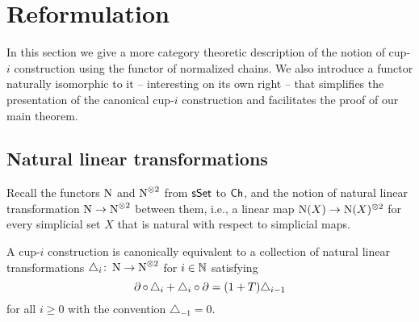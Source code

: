 
\section{Reformulation} \label{s:reformulation}

In this section we give a more category theoretic description of the notion of \mbox{cup-$i$} construction using the functor of normalized chains.
We also introduce a functor naturally isomorphic to it -- interesting on its own right -- that simplifies the presentation of the canonical cup-$i$ construction and facilitates the proof of our main theorem.

\subsection{Natural linear transformations}

Recall the functors $\operatorname{N}$ and $\operatorname{N}^{\otimes 2}$ from $\mathsf{sSet}$ to $\mathsf{Ch}$, and the notion of natural linear transformation $\operatorname{N} \to \operatorname{N}^{\otimes 2}$ between them, i.e., a linear map $\operatorname{N}(X) \to \operatorname{N}(X)^{\otimes 2}$ for every simplicial set $X$ that is natural with respect to simplicial maps.

\begin{lemma} \label{l:coalgebra}
	A \mbox{cup-$i$} construction is canonically equivalent to a collection of natural linear transformations $\triangle_i \colon \operatorname{N} \to \operatorname{N}^{\otimes 2}$ for $i \in \mathbb{N}$ satisfying
	\[
	\operatorname{\partial} \circ \, \triangle_i + \triangle_i \circ \operatorname{\partial} =
	(1+T) \triangle_{i-1}
	\]
	for all $i \geq 0$ with the convention $\triangle_{-1} = 0$.
\end{lemma}

